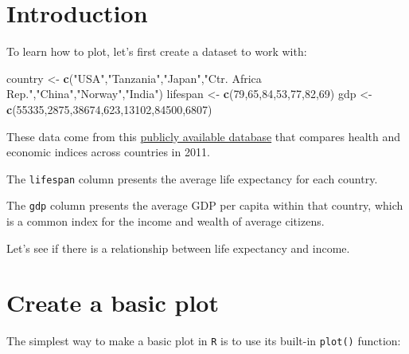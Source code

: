 \documentclass[
]{book}
\newenvironment{Shaded}{\begin{snugshade}}{\end{snugshade}}
\newcommand{\DecValTok}[1]{\textcolor[rgb]{0.00,0.00,0.81}{#1}}
\newcommand{\KeywordTok}[1]{\textcolor[rgb]{0.13,0.29,0.53}{\textbf{#1}}}
\newcommand{\NormalTok}[1]{#1}
\newcommand{\StringTok}[1]{\textcolor[rgb]{0.31,0.60,0.02}{#1}}
\begin{document}
\hypertarget{introduction}{%
\section*{Introduction}\label{introduction}}

To learn how to plot, let's first create a dataset to work with:

\begin{Shaded}
\begin{Highlighting}[]
\NormalTok{country <-}\StringTok{ }\KeywordTok{c}\NormalTok{(}\StringTok{"USA"}\NormalTok{,}\StringTok{"Tanzania"}\NormalTok{,}\StringTok{"Japan"}\NormalTok{,}\StringTok{"Ctr. Africa Rep."}\NormalTok{,}\StringTok{"China"}\NormalTok{,}\StringTok{"Norway"}\NormalTok{,}\StringTok{"India"}\NormalTok{)}
\NormalTok{lifespan <-}\StringTok{ }\KeywordTok{c}\NormalTok{(}\DecValTok{79}\NormalTok{,}\DecValTok{65}\NormalTok{,}\DecValTok{84}\NormalTok{,}\DecValTok{53}\NormalTok{,}\DecValTok{77}\NormalTok{,}\DecValTok{82}\NormalTok{,}\DecValTok{69}\NormalTok{)}
\NormalTok{gdp <-}\StringTok{ }\KeywordTok{c}\NormalTok{(}\DecValTok{55335}\NormalTok{,}\DecValTok{2875}\NormalTok{,}\DecValTok{38674}\NormalTok{,}\DecValTok{623}\NormalTok{,}\DecValTok{13102}\NormalTok{,}\DecValTok{84500}\NormalTok{,}\DecValTok{6807}\NormalTok{)}
\end{Highlighting}
\end{Shaded}

These data come from this \href{https://datasets.iisg.amsterdam/dataset.xhtml?persistentId=hdl:10622/LKYT53}{publicly available database} that compares health and economic indices across countries in 2011.

The \texttt{lifespan} column presents the average life expectancy for each country.

The \texttt{gdp} column presents the average GDP per capita within that country, which is a common index for the income and wealth of average citizens.

Let's see if there is a relationship between life expectancy and income.

\hypertarget{create-a-basic-plot}{%
\section*{Create a basic plot}\label{create-a-basic-plot}}

The simplest way to make a basic plot in \texttt{R} is to use its built-in \texttt{plot()} function:
\end{document}
